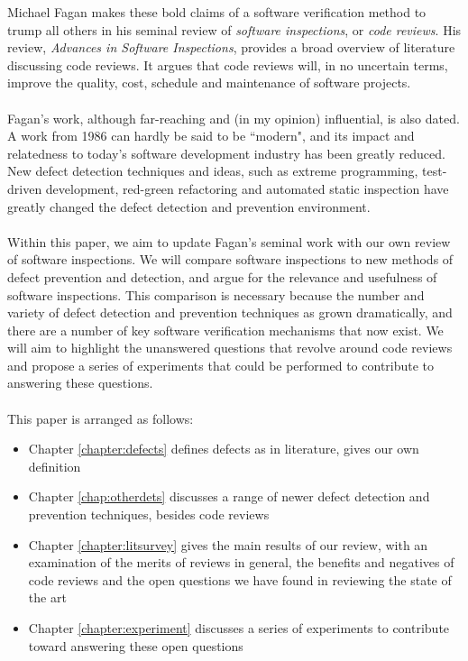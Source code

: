 Michael Fagan \cite{AdvancesInSoftwareInspection} makes these bold claims of a
software verification method to trump all others in his seminal review of {\em
  software inspections}, or {\em code reviews}.
His review, {\it Advances in Software Inspections}, provides a broad overview of
literature discussing code reviews.
It argues that code reviews will, in no uncertain terms, improve the quality,
   cost, schedule and maintenance of software projects.\\
\\
Fagan's work, although far-reaching and (in my opinion) influential, is also
dated.
A work from 1986 can hardly be said to be ``modern", and its impact and
relatedness to today's software development industry has been greatly reduced.
New defect detection techniques and ideas, such as extreme programming,
test-driven development, red-green refactoring and automated static
inspection have greatly changed the defect detection and prevention
environment.\\
\\
Within this paper, we aim to update Fagan's seminal work with our own
review of software inspections.
We will compare software inspections to new methods of defect prevention and
detection, and argue for the relevance and usefulness of software inspections.
This comparison is necessary because the number and variety of defect detection and prevention
techniques as grown dramatically, and there are a number of key software verification mechanisms
that now exist.
We will aim to highlight the unanswered questions that revolve around code
reviews and propose a series of experiments that could be performed to
contribute to answering these questions.\\
\\
This paper is arranged as follows:
\begin{itemize}
  \item Chapter \ref{chapter:defects} defines defects as in literature, gives
  our own definition 
  \item Chapter \ref{chap:otherdets} discusses a range of newer defect detection
  and prevention techniques, besides code reviews
  \item Chapter \ref{chapter:litsurvey} gives the main results of our review, with
  an examination of the merits of reviews in general, the benefits and
  negatives of code reviews and the open questions we have found in reviewing
  the state of the art
  \item Chapter \ref{chapter:experiment} discusses a series of experiments to
  contribute toward answering these open questions
\end{itemize}
